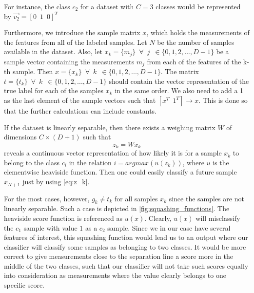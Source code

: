 \documentclass{article}
\begin{document}
For instance, the class $c_2$ for a dataset with $C=3$ classes would be represented by
$\vec{v_2} = [ 0\enspace 1\enspace  0 ]^T$

Furthermore, we introduce the sample matrix $x$, which holds the measurements of the features from
all of the labeled samples. Let $N$ be the number of samples available in the dataset. Also,
let $x_k = \{m_j\} \enspace \forall \enspace j \enspace \in \{0, 1, 2, ..., D - 1\}$ be a sample vector containing
the measurements $m_j$ from each of the features of the k-th sample. Then $x = \{x_k\} \enspace \forall \enspace k \enspace
\in \{0, 1, 2, ..., D - 1\}$. The matrix $t = \{t_k\} \enspace \forall \enspace k \enspace
\in \{0, 1, 2, ..., D - 1\}$ should contain the vector representation of the true label for each of the samples
$x_k$ in the same order. We also need to add a 1 as the last element of the sample vectors such that
$[ x^T \enspace 1 ^T ] \rightarrow x$. This is done so that the further calculations can include constants.

If the dataset is linearly separable, then there exists \cite[p. 16]{compendium} a weighing matrix $W$ of dimensions $C \times (D+1)$ such
that
\begin{equation}
    z_k = Wx_k \label{eq:z_k}
\end{equation}
reveals a continuous vector representation of how likely it is for a sample $x_k$ to belong to the class
$c_i$ in the relation $i = argmax(u(z_k))$, where $u$ is the elementwise heaviside function. Then one could
easily classify a future sample $x_{N+1}$ just by using \eqref{eq:z_k}.

For the most cases, however, $g_k \neq t_k $ for all samples $x_k$ since the samples are not linearly
separable. Such a case is depicted in \autoref{fig:squashing_functions}. The heaviside score function is referenced
as $u(x)$. Clearly, $u(x)$ will misclassify the $c_1$ sample with value $1$ as a $c_2$ sample. Since
we in our case have several features of interest, this squashing function would lead us to an output
where our classifier will classify some samples as belonging to two classes. It would be more
correct to give measurements close to the separation line a score more in the middle of the two classes,
such that our classifier will not take such scores equally into consideration as measurements where
the value clearly belongs to one specific score.
\end{document}
